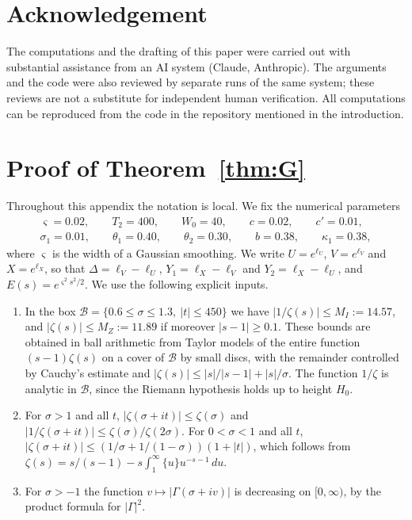 \documentclass[11pt]{amsart}
\numberwithin{equation}{section}
\theoremstyle{definition}
\theoremstyle{remark}
\begin{document}
\section*{Acknowledgement}
The computations and the drafting of this paper were carried out with substantial assistance from an AI system (Claude, Anthropic).
The arguments and the code were also reviewed by separate runs of the same system; these reviews are not a substitute for independent human verification.
All computations can be reproduced from the code in the repository mentioned in the introduction.

\appendix

\section{Proof of Theorem~\ref{thm:G}}\label{app:G}

Throughout this appendix the notation is local.
We fix the numerical parameters
\begin{gather*}
\varsigma = 0.02, \qquad T_2 = 400, \qquad W_0 = 40, \qquad c = 0.02, \qquad c' = 0.01,\\
\sigma_1 = 0.01, \qquad \theta_1 = 0.40, \qquad \theta_2 = 0.30, \qquad b = 0.38, \qquad \kappa_1 = 0.38,
\end{gather*}
where $\varsigma$ is the width of a Gaussian smoothing.
We write $U = e^{\ell_U}$, $V = e^{\ell_V}$ and $X = e^{\ell_X}$, so that $\Delta = \ell_V - \ell_U$, $Y_1 = \ell_X - \ell_V$ and $Y_2 = \ell_X - \ell_U$, and $E(s) = e^{\varsigma^2s^2/2}$.
We use the following explicit inputs.
\begin{enumerate}
\item[(B1)] In the box $\mathcal B = \{0.6 \leq \sigma \leq 1.3,\ |t| \leq 450\}$ we have $|1/\zeta(s)| \leq M_I := 14.57$, and $|\zeta(s)| \leq M_Z := 11.89$ if moreover $|s - 1| \geq 0.1$.
These bounds are obtained in ball arithmetic from Taylor models of the entire function $(s-1)\zeta(s)$ on a cover of $\mathcal B$ by small discs, with the remainder controlled by Cauchy's estimate and $|\zeta(s)| \leq |s|/|s-1| + |s|/\sigma$.
The function $1/\zeta$ is analytic in $\mathcal B$, since the Riemann hypothesis holds up to height $H_0$.
\item[(B2)] For $\sigma > 1$ and all $t$, $|\zeta(\sigma + it)| \leq \zeta(\sigma)$ and $|1/\zeta(\sigma + it)| \leq \zeta(\sigma)/\zeta(2\sigma)$.
For $0 < \sigma < 1$ and all $t$, $|\zeta(\sigma + it)| \leq (1/\sigma + 1/(1 - \sigma))(1 + |t|)$, which follows from $\zeta(s) = s/(s-1) - s\int_1^\infty\{u\}u^{-s-1}\,du$.
\item[(B3)] For $\sigma > -1$ the function $v \mapsto |\Gamma(\sigma + iv)|$ is decreasing on $[0, \infty)$, by the product formula for $|\Gamma|^2$.
\end{enumerate}
\end{document}

